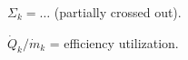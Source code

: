\( \Sigma_k = \dots \) (partially crossed out).  

\( \dot{Q}_k / \dot{m}_k \) = efficiency utilization.